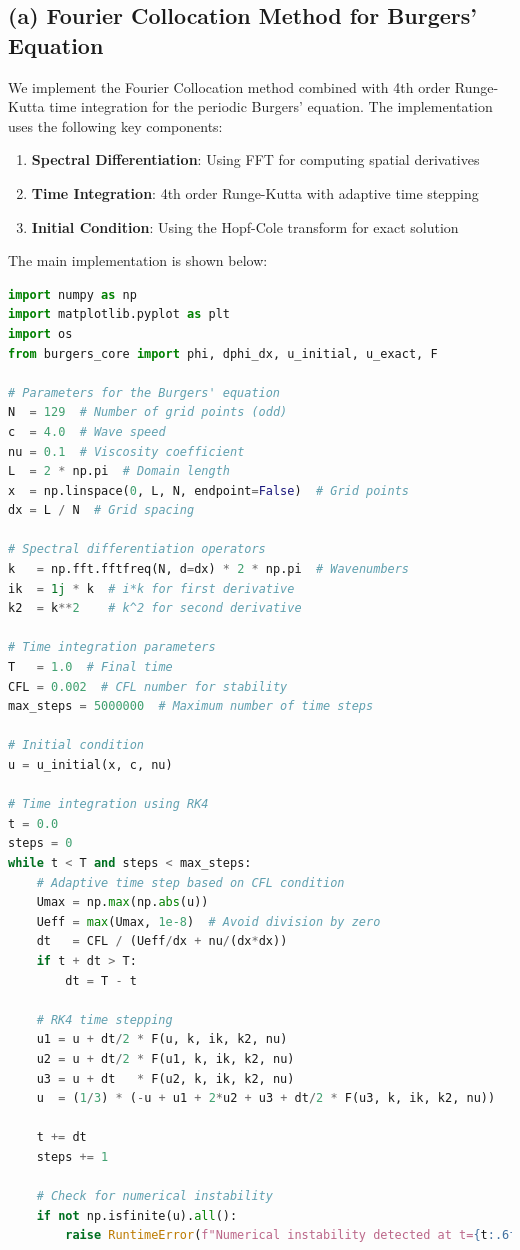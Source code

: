 \documentclass{article}
\begin{document}
\subsection*{(a) Fourier Collocation Method for Burgers' Equation}
We implement the Fourier Collocation method combined with 4th order Runge-Kutta time integration for the periodic Burgers' equation. The implementation uses the following key components:

\begin{enumerate}
    \item \textbf{Spectral Differentiation}: Using FFT for computing spatial derivatives
    \item \textbf{Time Integration}: 4th order Runge-Kutta with adaptive time stepping
    \item \textbf{Initial Condition}: Using the Hopf-Cole transform for exact solution
\end{enumerate}

The main implementation is shown below:

\begin{lstlisting}[language=Python]
import numpy as np
import matplotlib.pyplot as plt
import os
from burgers_core import phi, dphi_dx, u_initial, u_exact, F

# Parameters for the Burgers' equation
N  = 129  # Number of grid points (odd)
c  = 4.0  # Wave speed
nu = 0.1  # Viscosity coefficient
L  = 2 * np.pi  # Domain length
x  = np.linspace(0, L, N, endpoint=False)  # Grid points
dx = L / N  # Grid spacing

# Spectral differentiation operators
k   = np.fft.fftfreq(N, d=dx) * 2 * np.pi  # Wavenumbers
ik  = 1j * k  # i*k for first derivative
k2  = k**2    # k^2 for second derivative

# Time integration parameters
T   = 1.0  # Final time
CFL = 0.002  # CFL number for stability
max_steps = 5000000  # Maximum number of time steps

# Initial condition
u = u_initial(x, c, nu)

# Time integration using RK4
t = 0.0
steps = 0
while t < T and steps < max_steps:
    # Adaptive time step based on CFL condition
    Umax = np.max(np.abs(u))
    Ueff = max(Umax, 1e-8)  # Avoid division by zero
    dt   = CFL / (Ueff/dx + nu/(dx*dx))
    if t + dt > T:
        dt = T - t
    
    # RK4 time stepping
    u1 = u + dt/2 * F(u, k, ik, k2, nu)
    u2 = u + dt/2 * F(u1, k, ik, k2, nu)
    u3 = u + dt   * F(u2, k, ik, k2, nu)
    u  = (1/3) * (-u + u1 + 2*u2 + u3 + dt/2 * F(u3, k, ik, k2, nu))
    
    t += dt
    steps += 1
    
    # Check for numerical instability
    if not np.isfinite(u).all():
        raise RuntimeError(f"Numerical instability detected at t={t:.6f} (CFL={CFL})")
\end{lstlisting}
\end{document}
